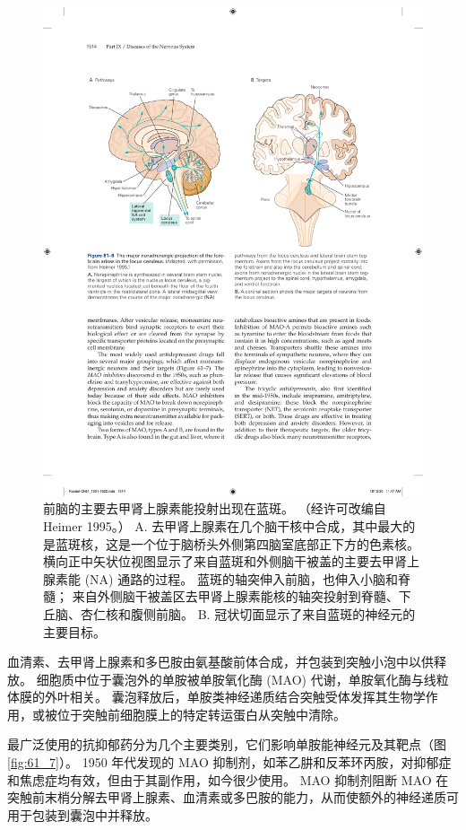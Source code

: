 \begin{figure}[htbp]
	\centering
	\includegraphics[width=0.9\linewidth]{chap61/fig_61_6}
	\caption{前脑的主要去甲肾上腺素能投射出现在蓝斑。 （经许可改编自 Heimer 1995。） A. 去甲肾上腺素在几个脑干核中合成，其中最大的是蓝斑核，这是一个位于脑桥头外侧第四脑室底部正下方的色素核。 横向正中矢状位视图显示了来自蓝斑和外侧脑干被盖的主要去甲肾上腺素能 (NA) 通路的过程。 蓝斑的轴突伸入前脑，也伸入小脑和脊髓； 来自外侧脑干被盖区去甲肾上腺素能核的轴突投射到脊髓、下丘脑、杏仁核和腹侧前脑。 B. 冠状切面显示了来自蓝斑的神经元的主要目标。}
	\label{fig:61_6}
\end{figure}


血清素、去甲肾上腺素和多巴胺由氨基酸前体合成，并包装到突触小泡中以供释放。
细胞质中位于囊泡外的单胺被单胺氧化酶 (MAO) 代谢，单胺氧化酶与线粒体膜的外叶相关。
囊泡释放后，单胺类神经递质结合突触受体发挥其生物学作用，或被位于突触前细胞膜上的特定转运蛋白从突触中清除。


最广泛使用的抗抑郁药分为几个主要类别，它们影响单胺能神经元及其靶点（图 \ref{fig:61_7}）。
1950 年代发现的 MAO 抑制剂，如苯乙肼和反苯环丙胺，对抑郁症和焦虑症均有效，但由于其副作用，如今很少使用。
MAO 抑制剂阻断 MAO 在突触前末梢分解去甲肾上腺素、血清素或多巴胺的能力，从而使额外的神经递质可用于包装到囊泡中并释放。


